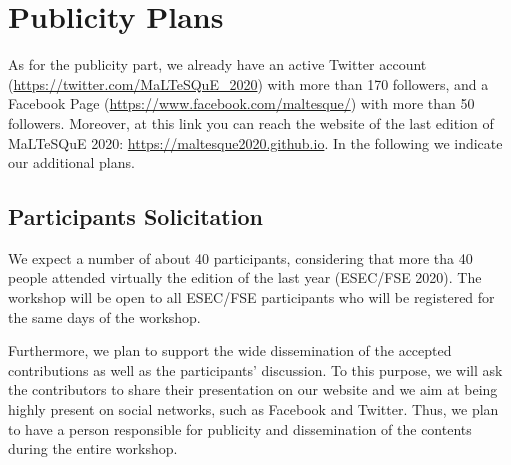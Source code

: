 
\section{Publicity Plans}

As for the publicity part, we already have an active Twitter account (\url{https://twitter.com/MaLTeSQuE_2020}) with more than 170 followers, and a Facebook Page (\url{https://www.facebook.com/maltesque/}) with more than 50 followers.
Moreover, at this link you can reach the website of the last edition of MaLTeSQuE 2020: \url{https://maltesque2020.github.io}.
In the following we indicate our additional plans.

\subsection{Participants Solicitation}

We expect a number of about 40 participants, considering that more tha 40 people attended virtually the edition of the last year (ESEC/FSE 2020).
The workshop will be open to all ESEC/FSE participants who will be registered for the same days of the workshop.

Furthermore, we plan to support the wide dissemination of the accepted contributions as well as the participants' discussion.
To this purpose, we will ask the contributors to share their presentation on our website and we aim at being highly present on social networks, such as Facebook and Twitter.
Thus, we plan to have a person responsible for publicity and dissemination of the contents during the entire workshop.

